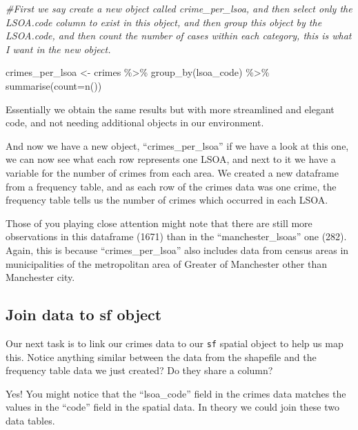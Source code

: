 \documentclass[
]{book}
\newenvironment{Shaded}{\begin{snugshade}}{\end{snugshade}}
\newcommand{\AttributeTok}[1]{\textcolor[rgb]{0.77,0.63,0.00}{#1}}
\newcommand{\CommentTok}[1]{\textcolor[rgb]{0.56,0.35,0.01}{\textit{#1}}}
\newcommand{\FunctionTok}[1]{\textcolor[rgb]{0.00,0.00,0.00}{#1}}
\newcommand{\NormalTok}[1]{#1}
\newcommand{\OtherTok}[1]{\textcolor[rgb]{0.56,0.35,0.01}{#1}}
\newcommand{\SpecialCharTok}[1]{\textcolor[rgb]{0.00,0.00,0.00}{#1}}
\begin{document}
\begin{Shaded}
\begin{Highlighting}[]
\CommentTok{\#First we say create a new object called crime\_per\_lsoa, and then select only the LSOA.code column to exist in this object, and then group this object by the LSOA.code, and then count the number of cases within each category, this is what I want in the new object.}

\NormalTok{crimes\_per\_lsoa }\OtherTok{\textless{}{-}}\NormalTok{ crimes }\SpecialCharTok{\%\textgreater{}\%}
  \FunctionTok{group\_by}\NormalTok{(lsoa\_code) }\SpecialCharTok{\%\textgreater{}\%}
  \FunctionTok{summarise}\NormalTok{(}\AttributeTok{count=}\FunctionTok{n}\NormalTok{())}
\end{Highlighting}
\end{Shaded}

Essentially we obtain the same results but with more streamlined and elegant code, and not needing additional objects in our environment.

And now we have a new object, ``crimes\_per\_lsoa'' if we have a look at this one, we can now see what each row represents one LSOA, and next to it we have a variable for the number of crimes from each area. We created a new dataframe from a frequency table, and as each row of the crimes data was one crime, the frequency table tells us the number of crimes which occurred in each LSOA.

Those of you playing close attention might note that there are still more observations in this dataframe (1671) than in the ``manchester\_lsoas'' one (282). Again, this is because ``crimes\_per\_lsoa'' also includes data from census areas in municipalities of the metropolitan area of Greater of Manchester other than Manchester city.

\hypertarget{join-data-to-sf-object}{%
\subsection{Join data to sf object}\label{join-data-to-sf-object}}

Our next task is to link our crimes data to our \texttt{sf} spatial object to help us map this. Notice anything similar between the data from the shapefile and the frequency table data we just created? Do they share a column?

Yes! You might notice that the ``lsoa\_code'' field in the crimes data matches the values in the ``code'' field in the spatial data. In theory we could join these two data tables.
\end{document}
